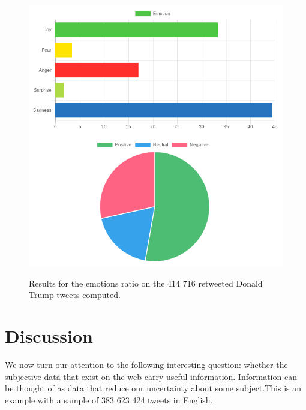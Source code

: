 \documentclass{acmtog} %
\begin{document}
\begin{figure}[h!]
{\includegraphics[width=\linewidth]{retweeted_emotion_sentiment_trump-exemple.png}}
\caption{Results for the emotions ratio on the 414 716 retweeted Donald Trump tweets computed.}
  \label{fig:trump_results}
\end{figure}


\section{Discussion}
\label{sec:discussion}

We now turn our attention to the following interesting question: whether the subjective data that exist on the web carry useful information. Information can be thought of as data that reduce our uncertainty about some subject.This is an example with a sample of 383 623 424 tweets in English.

\begin{table}[h!]

\label{tab:cross_tab}
\end{table}
\end{document}
